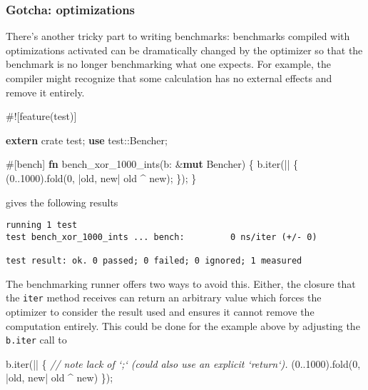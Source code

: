 \documentclass[a4paper,]{book}
\newenvironment{Shaded}{\begin{snugshade}}{\end{snugshade}}
\newcommand{\KeywordTok}[1]{\textcolor[rgb]{0.13,0.29,0.53}{\textbf{{#1}}}}
\newcommand{\DecValTok}[1]{\textcolor[rgb]{0.00,0.00,0.81}{{#1}}}
\newcommand{\CommentTok}[1]{\textcolor[rgb]{0.56,0.35,0.01}{\textit{{#1}}}}
\newcommand{\OtherTok}[1]{\textcolor[rgb]{0.56,0.35,0.01}{{#1}}}
\newcommand{\NormalTok}[1]{{#1}}
\begin{document}
\subsubsection{Gotcha: optimizations}\label{gotcha-optimizations}

There's another tricky part to writing benchmarks: benchmarks compiled
with optimizations activated can be dramatically changed by the
optimizer so that the benchmark is no longer benchmarking what one
expects. For example, the compiler might recognize that some calculation
has no external effects and remove it entirely.

\begin{Shaded}
\begin{Highlighting}[]
\NormalTok{#![feature(test)]}

\KeywordTok{extern} \NormalTok{crate test;}
\KeywordTok{use} \NormalTok{test::Bencher;}

\OtherTok{#[}\NormalTok{bench}\OtherTok{]}
\KeywordTok{fn} \NormalTok{bench_xor_1000_ints(b: &}\KeywordTok{mut} \NormalTok{Bencher) \{}
    \NormalTok{b.iter(|| \{}
        \NormalTok{(}\DecValTok{0.}\NormalTok{.}\DecValTok{1000}\NormalTok{).fold(}\DecValTok{0}\NormalTok{, |old, new| old ^ new);}
    \NormalTok{\});}
\NormalTok{\}}
\end{Highlighting}
\end{Shaded}

gives the following results

\begin{verbatim}
running 1 test
test bench_xor_1000_ints ... bench:         0 ns/iter (+/- 0)

test result: ok. 0 passed; 0 failed; 0 ignored; 1 measured
\end{verbatim}

The benchmarking runner offers two ways to avoid this. Either, the
closure that the \texttt{iter} method receives can return an arbitrary
value which forces the optimizer to consider the result used and ensures
it cannot remove the computation entirely. This could be done for the
example above by adjusting the \texttt{b.iter} call to

\begin{Shaded}
\begin{Highlighting}[]
\NormalTok{b.iter(|| \{}
    \CommentTok{// note lack of `;` (could also use an explicit `return`).}
    \NormalTok{(}\DecValTok{0.}\NormalTok{.}\DecValTok{1000}\NormalTok{).fold(}\DecValTok{0}\NormalTok{, |old, new| old ^ new)}
\NormalTok{\});}
\end{Highlighting}
\end{Shaded}
\end{document}
